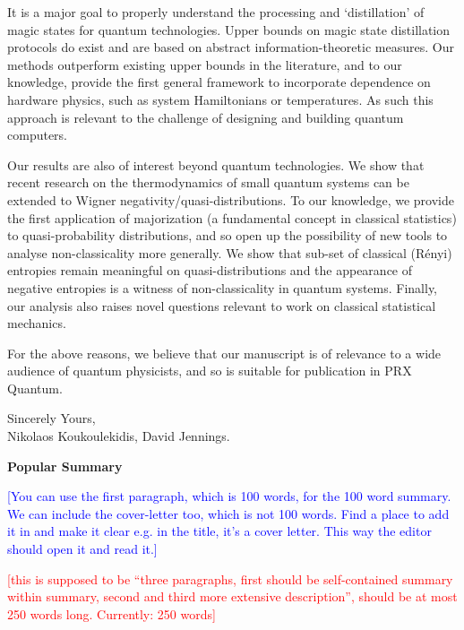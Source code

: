 \documentclass[11pt]{letter}
\newcommand{\nick}[1]{\textcolor{red}{[#1]}}
\newcommand{\ddd}[1]{\textcolor{blue}{[#1]}}
\begin{document}
It is a major goal to properly understand the processing and `distillation' of magic states for quantum technologies. Upper bounds on magic state distillation protocols do exist and are based on abstract information-theoretic measures. Our methods outperform existing upper bounds in the literature, and to our knowledge, provide the first general framework to incorporate dependence on hardware physics, such as system Hamiltonians or temperatures. As such this approach is relevant to the challenge of designing and building quantum computers.

Our results are also of interest beyond quantum technologies. We show that recent research on the thermodynamics of small quantum systems can be extended to Wigner negativity/quasi-distributions. To our knowledge, we provide the first application of majorization (a fundamental concept in classical statistics) to quasi-probability distributions, and so open up the possibility of new tools to analyse non-classicality more generally. We show that sub-set of classical (R\'{e}nyi) entropies remain meaningful on quasi-distributions and the appearance of negative entropies is a witness of non-classicality in quantum systems. Finally, our analysis also raises novel questions relevant to work on classical statistical mechanics.

For the above reasons, we believe that our manuscript is of relevance to a wide audience of quantum physicists, and so is suitable for publication in PRX Quantum.

\vspace{1cm}
\hspace{8cm}
\begin{minipage}{9cm}
\flushleft
Sincerely Yours,\\

Nikolaos Koukoulekidis, David Jennings.
\end{minipage}
\newpage


\textbf{Popular Summary}

\ddd{You can use the first paragraph, which is 100 words, for the 100 word summary. We can include the cover-letter too, which is not 100 words. Find a place to add it in and make it clear e.g. in the title, it's a cover letter. This way the editor should open it and read it.}

\nick{this is supposed to be ``three paragraphs, first should be self-contained summary within summary, second and third more extensive description'', should be at most 250 words long. Currently: 250 words}
\end{document}
